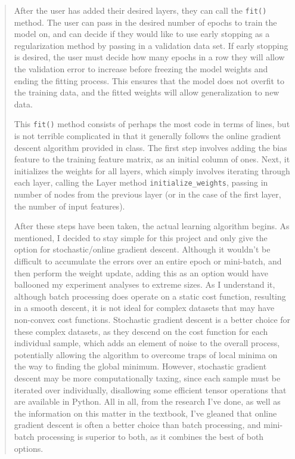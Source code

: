 \documentclass{article}
\begin{document}
\begin{quote}
After the user has added their desired layers, they can call the \texttt{fit()} method. The user can pass in the desired number of epochs to train the model on, and can decide if they would like to use early stopping as a regularization method by passing in a validation data set. If early stopping is desired, the user must decide how many epochs in a row they will allow the validation error to increase before freezing the model weights and ending the fitting process. This ensures that the model does not overfit to the training data, and the fitted weights will allow generalization to new data.

This \texttt{fit()} method consists of perhaps the most code in terms of lines, but is not terrible complicated in that it generally follows the online gradient descent algorithm provided in class. The first step involves adding the bias feature to the training feature matrix, as an initial column of ones. Next, it initializes the weights for all layers, which simply involves iterating through each layer, calling the Layer method \texttt{initialize\_weights}, passing in number of nodes from the previous layer (or in the case of the first layer, the number of input features). 

After these steps have been taken, the actual learning algorithm begins. As mentioned, I decided to stay simple for this project and only give the option for stochastic/online gradient descent. Although it wouldn't be difficult to accumulate the errors over an entire epoch or mini-batch, and then perform the weight update, adding this as an option would have ballooned my experiment analyses to extreme sizes. As I understand it, although batch processing does operate on a static cost function, resulting in a smooth descent, it is not ideal for complex datasets that may have non-convex cost functions. Stochastic gradient descent is a better choice for these complex datasets, as they descend on the cost function for each individual sample, which adds an element of noise to the overall process, potentially allowing the algorithm to overcome traps of local minima on the way to finding the global minimum. However, stochastic gradient descent may be more computationally taxing, since each sample must be iterated over individually, disallowing some efficient tensor operations that are available in Python. All in all, from the research I've done, as well as the information on this matter in the textbook, I've gleaned that online gradient descent is often a better choice than batch processing, and mini-batch processing is superior to both, as it combines the best of both options.


\end{quote}
\end{document}

